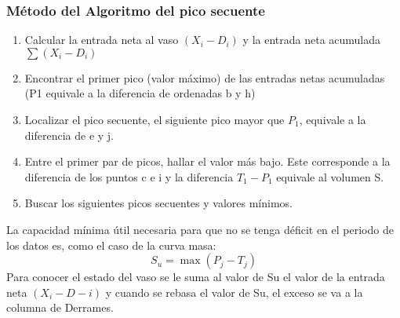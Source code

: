 \subsubsection{Método del Algoritmo del pico secuente}
\begin{enumerate}
    \item Calcular la entrada neta al vaso $\left(X_i-D_i\right)$ y la entrada neta acumulada $\sum \left(X_i-D_i\right)$
    \item Encontrar el primer pico (valor máximo) de las entradas netas acumuladas (P1 equivale a la diferencia de ordenadas b y h)
    \item Localizar el pico secuente, el siguiente pico mayor que $P_1$, equivale a la diferencia de e y j.
    \item Entre el primer par de picos, hallar el valor más bajo. Este corresponde a la diferencia de los puntos c e i y la diferencia $T_1-P_1$ equivale al volumen S.
    \item Buscar los siguientes picos secuentes y valores mínimos.
\end{enumerate}
La capacidad mínima útil necesaria para que no se tenga déficit en el periodo de los datos es, como el caso de la curva masa:
\begin{equation}
    S_u =\max{\left(P_j- T_j\right)}
\end{equation}
Para conocer el estado del vaso se le suma al valor de Su el valor de la entrada neta $\left(X_i - D-i\right)$ y cuando se rebasa el valor de Su, el exceso se va a la columna de Derrames.

